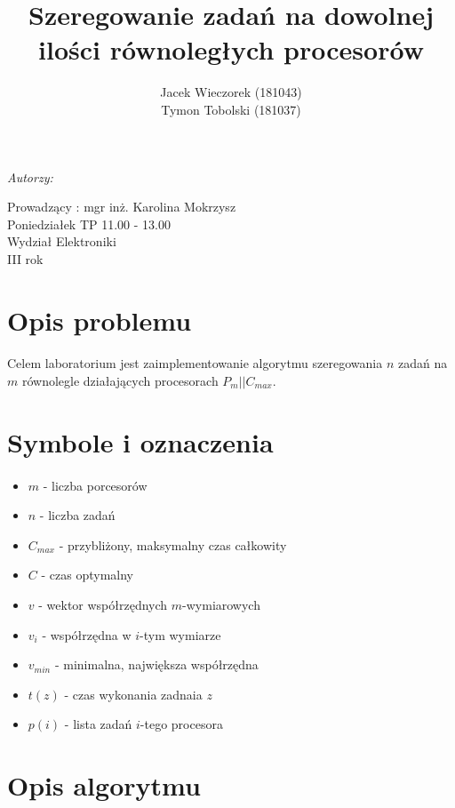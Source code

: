 \documentclass[wide,a4paper,titlepage,12pt] {article}
\title{Szeregowanie zadań na dowolnej ilości równoległych procesorów}
\author{Jacek Wieczorek (181043)\\Tymon Tobolski (181037) }
\makeatletter
\renewcommand{\maketitle}{
  \begin{titlepage}
    \begin{center}
      \vspace*{3cm}
      \LARGE \@title \par
      \vspace{2cm}
      \textit{\small Autorzy:}\par
      \normalsize \@author\par \normalsize
      \vspace{3cm}
      Prowadzący : mgr inż. Karolina Mokrzysz\\
      Poniedziałek TP 11.00 - 13.00\\
      \vspace{3cm}
      Wydział Elektroniki\\ III rok \par
      \vspace{3cm}
      \small \@date
    \end{center}
  \end{titlepage}
}
\makeatother
\begin{document}
  \maketitle
  \section{Opis problemu}
\paragraph{}
 Celem laboratorium jest zaimplementowanie algorytmu szeregowania $n$ zadań na $m$ równolegle działających procesorach $P_{m} || C_{max}$.

  \section{Symbole i oznaczenia}
\paragraph{}
  \begin{itemize}
    \item $m$ - liczba porcesorów
    \item $n$ - liczba zadań
    \item $C_{max}$ - przybliżony, maksymalny czas całkowity
    \item $C$ - czas optymalny
    \item $v$ - wektor współrzędnych $m$-wymiarowych
    \item $v_i$ - współrzędna w $i$-tym wymiarze
    \item $v_{min}$ - minimalna, największa współrzędna 
    \item $t(z)$ - czas wykonania zadnaia $z$
    \item $p(i)$ - lista zadań $i$-tego procesora
    
  \end{itemize}

  \section{Opis algorytmu}
\end{document}
